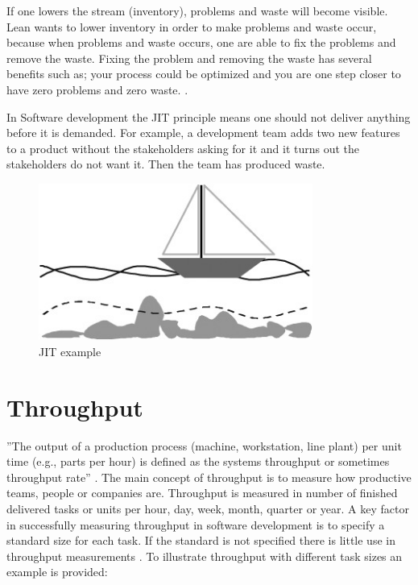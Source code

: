 \documentclass[UKenglish]{ifimaster}  %
\begin{document}
If one lowers the stream (inventory), problems and waste will become visible. Lean wants to lower inventory in order to make problems and waste occur, because when problems and waste occurs, one are able to fix the problems and remove the waste. Fixing the problem and removing the waste has several benefits such as; your process could be optimized and you are one step closer to have zero problems and zero waste.  \parencite{JIT} \parencite{Lean:2006}.

In Software development the JIT principle means one should not deliver anything before it is demanded. For example, a development team adds two new features to a product without the stakeholders asking for it and it turns out the stakeholders do not want it. Then the team has produced waste. 
\begin{figure}[ht!]
\centering
\includegraphics[width=90mm]{Picture/JIT.jpg}
\caption{JIT example}
\label{JITE} %
\end{figure}

\section{Throughput}
''The output of a production process (machine, workstation, line plant) per unit time (e.g., parts per hour) is defined as the systems throughput or sometimes throughput rate'' \parencite{Adams}.
The main concept of throughput is to measure how productive teams, people or companies are. Throughput is measured in number of finished delivered tasks or units per hour, day, week, month, quarter or year. A key factor in successfully measuring throughput in software development is to specify a standard size for each task. If the standard is not specified there is little use in throughput measurements \parencite{Throughput}. To illustrate throughput with different task sizes an example is provided:  
\end{document}
